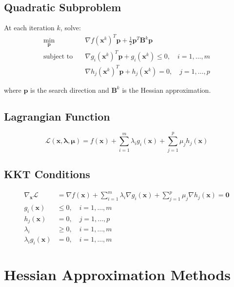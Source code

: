\documentclass{article}
\begin{document}
\subsection{Quadratic Subproblem}
At each iteration $k$, solve:
\begin{align}
\min_{\mathbf{p}} \quad &\nabla f(\mathbf{x}^k)^T \mathbf{p} + \frac{1}{2} \mathbf{p}^T \mathbf{B}^k \mathbf{p} \\
\text{subject to} \quad &\nabla g_i(\mathbf{x}^k)^T \mathbf{p} + g_i(\mathbf{x}^k) \leq 0, \quad i = 1, \ldots, m \\
&\nabla h_j(\mathbf{x}^k)^T \mathbf{p} + h_j(\mathbf{x}^k) = 0, \quad j = 1, \ldots, p
\end{align}

where $\mathbf{p}$ is the search direction and $\mathbf{B}^k$ is the Hessian approximation.

\subsection{Lagrangian Function}
\begin{equation}
\mathcal{L}(\mathbf{x}, \boldsymbol{\lambda}, \boldsymbol{\mu}) = f(\mathbf{x}) + \sum_{i=1}^{m} \lambda_i g_i(\mathbf{x}) + \sum_{j=1}^{p} \mu_j h_j(\mathbf{x})
\end{equation}

\subsection{KKT Conditions}
\begin{align}
\nabla_{\mathbf{x}} \mathcal{L} &= \nabla f(\mathbf{x}) + \sum_{i=1}^{m} \lambda_i \nabla g_i(\mathbf{x}) + \sum_{j=1}^{p} \mu_j \nabla h_j(\mathbf{x}) = \mathbf{0} \\
g_i(\mathbf{x}) &\leq 0, \quad i = 1, \ldots, m \\
h_j(\mathbf{x}) &= 0, \quad j = 1, \ldots, p \\
\lambda_i &\geq 0, \quad i = 1, \ldots, m \\
\lambda_i g_i(\mathbf{x}) &= 0, \quad i = 1, \ldots, m
\end{align}

\section{Hessian Approximation Methods}
\end{document}
